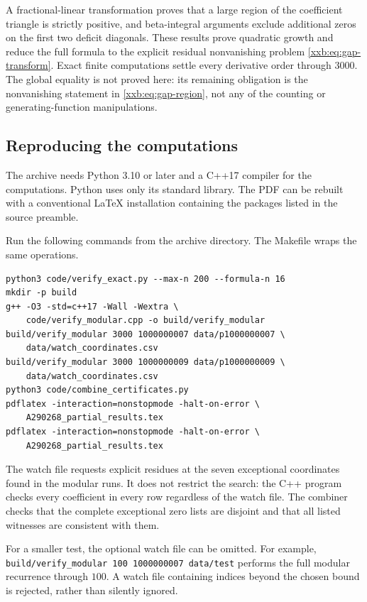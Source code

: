 \documentclass[11pt,a4paper]{article}
\numberwithin{equation}{section}
\theoremstyle{definition}
\theoremstyle{remark}
\theoremstyle{plain}
\begin{document}
A fractional-linear transformation proves that a large region of the
coefficient triangle is strictly positive, and beta-integral arguments
exclude additional zeros on the first two deficit diagonals. These
results prove quadratic growth and reduce the full formula to the
explicit residual nonvanishing problem \eqref{xxb:eq:gap-transform}.
Exact finite computations settle every derivative order through $3000$.
The global equality is not proved here: its remaining obligation is the
nonvanishing statement in \eqref{xxb:eq:gap-region}, not any of the counting
or generating-function manipulations.

\subsection{Reproducing the computations}\label{xxb:app:reproduce}
The archive needs Python 3.10 or later and a C++17 compiler for the
computations. Python uses only its standard library. The PDF can be
rebuilt with a conventional LaTeX installation containing the packages
listed in the source preamble.

Run the following commands from the archive directory. The Makefile
wraps the same operations.
\begin{lstlisting}
python3 code/verify_exact.py --max-n 200 --formula-n 16
mkdir -p build
g++ -O3 -std=c++17 -Wall -Wextra \
    code/verify_modular.cpp -o build/verify_modular
build/verify_modular 3000 1000000007 data/p1000000007 \
    data/watch_coordinates.csv
build/verify_modular 3000 1000000009 data/p1000000009 \
    data/watch_coordinates.csv
python3 code/combine_certificates.py
pdflatex -interaction=nonstopmode -halt-on-error \
    A290268_partial_results.tex
pdflatex -interaction=nonstopmode -halt-on-error \
    A290268_partial_results.tex
\end{lstlisting}
The watch file requests explicit residues at the seven exceptional
coordinates found in the modular runs. It does not restrict the search:
the C++ program checks every coefficient in every row regardless of the
watch file. The combiner checks that the complete exceptional zero lists
are disjoint and that all listed witnesses are consistent with them.

For a smaller test, the optional watch file can be omitted. For example,
\texttt{build/verify\_modular 100 1000000007 data/test} performs the full
modular recurrence through $100$. A watch file containing indices beyond
the chosen bound is rejected, rather than silently ignored.
\end{document}
